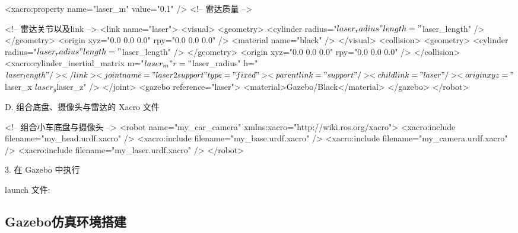 \documentclass[openany, fontset=windowsold]{ctexbook}
\theoremstyle{kaiti}
\theoremstyle{normal}
\begin{document}
\begin{xml}
      <xacro:property name="laser_m" value="0.1" /> <!-- 雷达质量 -->

      <!-- 雷达关节以及link -->
      <link name="laser">
          <visual>
              <geometry>
                  <cylinder radius="${laser_radius}" length="${laser_length}" />
              </geometry>
              <origin xyz="0.0 0.0 0.0" rpy="0.0 0.0 0.0" />
              <material name="black" />
          </visual>
          <collision>
              <geometry>
                  <cylinder radius="${laser_radius}" length="${laser_length}" />
              </geometry>
              <origin xyz="0.0 0.0 0.0" rpy="0.0 0.0 0.0" />
          </collision>
          <xacro:cylinder_inertial_matrix m="${laser_m}" r="${laser_radius}" h="${laser_length}" />
      </link>

      <joint name="laser2support" type="fixed">
          <parent link="support" />
          <child link="laser" />
          <origin xyz="${laser_x} ${laser_y} ${laser_z}" />
      </joint>
      <gazebo reference="laser">
          <material>Gazebo/Black</material>
      </gazebo>
  </robot>
\end{xml}

D. 组合底盘、摄像头与雷达的 Xacro 文件

\begin{xml}
  <!-- 组合小车底盘与摄像头 -->
  <robot name="my_car_camera" xmlns:xacro="http://wiki.ros.org/xacro">
      <xacro:include filename="my_head.urdf.xacro" />
      <xacro:include filename="my_base.urdf.xacro" />
      <xacro:include filename="my_camera.urdf.xacro" />
      <xacro:include filename="my_laser.urdf.xacro" />
  </robot>
\end{xml}

3. 在 Gazebo 中执行

launch 文件:


\subsection{Gazebo仿真环境搭建}
\end{document}
